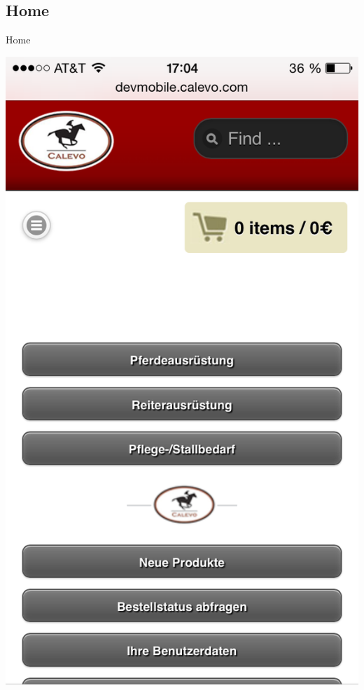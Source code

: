 \subsection{Home}
\begin{frame}[plain]{Home}
\begin{center}
  \includegraphics[width=\textwidth,height=1\textheight,keepaspectratio]{pics/home.png}
\end{center}
\end{frame}

